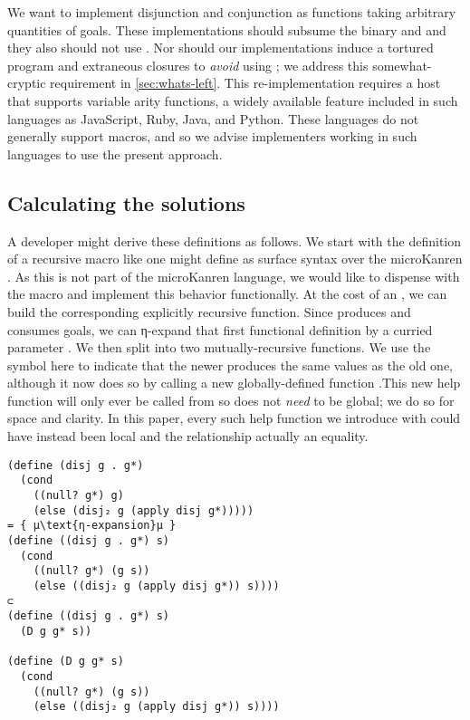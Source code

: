 \documentclass[sigplan,balance=true,pbalance=true,natbib=false]{acmart}
\begin{document}
We want to implement disjunction and conjunction as functions taking
arbitrary quantities of goals. These implementations should subsume
the binary  and  and they also
should not use . Nor should our implementations
induce a tortured program and extraneous closures to \emph{avoid}
using ; we address this somewhat-cryptic requirement
in \cref{sec:whats-left}. This re-implementation requires a host that
supports variable arity functions, a widely available feature included
in such languages as JavaScript, Ruby, Java, and Python. These
languages do not generally support macros, and so we advise
implementers working in such languages to use the present approach.

\subsection{Calculating the solutions}

A developer might derive these definitions as follows. We start with
the definition of a recursive  macro like one might
define as surface syntax over the microKanren . As
this is not part of the microKanren language, we would like to
dispense with the macro and implement this behavior functionally. At
the cost of an , we can build the corresponding
explicitly recursive  function. Since
 produces and consumes goals, we can η-expand that
first functional definition by a curried parameter . We
then split  into two mutually-recursive functions. We
use the symbol  here to indicate that the newer
 produces the same values as the old one, although it
now does so by calling a new globally-defined function
.\@ This new help function will only ever be called from
 so does not \emph{need} to be global; we do so for
space and clarity. In this paper, every such help function we
introduce with  could have instead been local and the
relationship actually an equality.

\begin{verbatim}
(define (disj g . g*)
  (cond
    ((null? g*) g)
    (else (disj₂ g (apply disj g*)))))
= { μ\text{η-expansion}μ }
(define ((disj g . g*) s)
  (cond
    ((null? g*) (g s))
    (else ((disj₂ g (apply disj g*)) s))))
⊂
(define ((disj g . g*) s)
  (D g g* s))

(define (D g g* s)
  (cond
    ((null? g*) (g s))
    (else ((disj₂ g (apply disj g*)) s))))
\end{verbatim}
\end{document}
